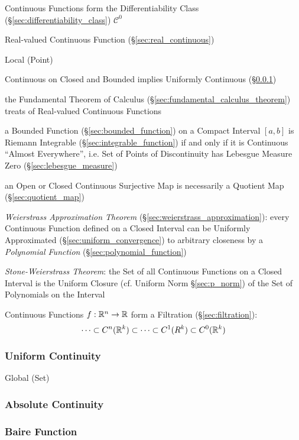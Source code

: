 Continuous Functions form the Differentiability Class
(\S\ref{sec:differentiability_class}) $\mathcal{C}^0$

Real-valued Continuous Function (\S\ref{sec:real_continuous})

Local (Point)

Continuous on Closed and Bounded implies Uniformly Continuous
(\S\ref{sec:uniform_continuity})

the Fundamental Theorem of Calculus (\S\ref{sec:fundamental_calculus_theorem})
treats of Real-valued Continuous Functions

a Bounded Function (\S\ref{sec:bounded_function}) on a Compact Interval $[a,b]$
is Riemann Integrable (\S\ref{sec:integrable_function}) if and only if it is
Continuous ``Almost Everywhere'', i.e. Set of Points of Discontinuity has
Lebesgue Measure Zero (\S\ref{sec:lebesgue_measure})

an Open or Closed Continuous Surjective Map is necessarily a Quotient Map
(\S\ref{sec:quotient_map})

\emph{Weierstrass Approximation Theorem}
(\S\ref{sec:weierstrass_approximation}): every Continuous Function defined on a
Closed Interval can be Uniformly Approximated (\S\ref{sec:uniform_convergence})
to arbitrary closeness by a \emph{Polynomial Function}
(\S\ref{sec:polynomial_function})

\emph{Stone-Weierstrass Theorem}: the Set of all Continuous Functions on a
Closed Interval is the Uniform Closure (cf. Uniform Norm \S\ref{sec:p_norm}) of
the Set of Polynomials on the Interval

Continuous Functions $f : \mathbb{R}^n \rightarrow \mathbb{R}$ form a Filtration
(\S\ref{sec:filtration}):
\[
  \cdots \subset C^n(\mathbb{R}^k) \subset \cdots \subset C^1(R^k) \subset
    C^0(\mathbb{R}^k)
\]



\subsubsection{Uniform Continuity}\label{sec:uniform_continuity}

Global (Set)



\subsubsection{Absolute Continuity}\label{sec:absolute_contunuity}

\subsubsection{Baire Function}\label{sec:baire_function}

